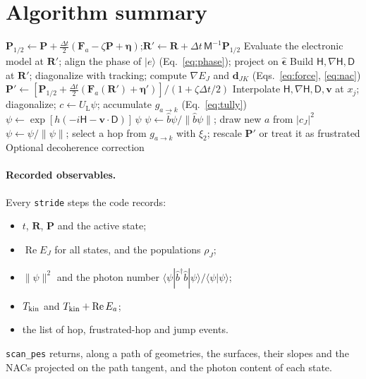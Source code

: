 \documentclass[11pt]{article}
\newcommand{\ket}[1]{\lvert #1 \rangle}
\newcommand{\R}{\mathbf{R}}
\newcommand{\Pv}{\mathbf{P}}
\newcommand{\vv}{\mathbf{v}}
\newcommand{\Mm}{\mathsf{M}}
\newcommand{\grad}{\nabla}
\newcommand{\dd}{\mathbf{d}}
\newcommand{\bdag}{\hat b^{\dagger}}
\newcommand{\bop}{\hat b}
\newcommand{\eps}{\hat{\bm{\epsilon}}}
\newcommand{\UL}{U_{\mathrm L}}
\newcommand{\Hm}{\mathsf{H}}
\newcommand{\Dm}{\mathsf{D}}
\newcommand{\Rep}{\operatorname{Re}}
\newcommand{\code}[1]{\texttt{#1}}
\begin{document}
\section{Algorithm summary}
\begin{algorithm}[h]
\caption{One nuclear step of \code{FSSH.step}}
\begin{algorithmic}[1]
\State $\Pv_{1/2}\gets\Pv+\frac{\Delta t}{2}(\mathbf F_a-\zeta\Pv+\bm\eta)$;\quad $\R'\gets\R+\Delta t\,\Mm^{-1}\Pv_{1/2}$
\State Evaluate the electronic model at $\R'$; align the phase of $\ket e$ (Eq.~\ref{eq:phase}); project on $\eps$
\State Build $\Hm,\grad\Hm,\Dm$ at $\R'$; diagonalize with tracking; compute $\grad E_J$ and $\dd_{JK}$ (Eqs.~\ref{eq:force}, \ref{eq:nac})
\State $\Pv'\gets[\Pv_{1/2}+\frac{\Delta t}{2}(\mathbf F_a(\R')+\bm\eta')]/(1+\zeta\Delta t/2)$
 
  \State Interpolate $\Hm,\grad\Hm,\Dm,\vv$ at $x_j$; diagonalize; $c\gets\UL\psi$; accumulate $g_{a\to k}$ (Eq.~\ref{eq:tully})
  \State $\psi\gets\exp[h(-i\Hm-\vv\cdot\Dm)]\,\psi$
\EndFor
{}
  \State $\psi\gets\bop\psi/\|\bop\psi\|$; draw new $a$ from $|c_J|^2$ 
\Else
  \State $\psi\gets\psi/\|\psi\|$; select a hop from $g_{a\to k}$ with $\xi_2$; rescale $\Pv'$ or treat it as frustrated
\EndIf
\State Optional decoherence correction
\end{algorithmic}
\end{algorithm}

\paragraph{Recorded observables.} Every \code{stride} steps the code records:
\begin{itemize}
\item $t$, $\R$, $\Pv$ and the active state;
\item $\Rep E_J$ for all states, and the populations $\rho_J$;
\item $\|\psi\|^2$ and the photon number $\langle\psi|\bdag\bop|\psi\rangle/\langle\psi|\psi\rangle$;
\item $T_{\rm kin}$ and $T_{\rm kin}+\Rep E_a$;
\item the list of hop, frustrated-hop and jump events.
\end{itemize}
\code{scan\_pes} returns, along a path of geometries, the surfaces, their slopes and the NACs projected on the path tangent, and the photon content of each state.
\end{document}
